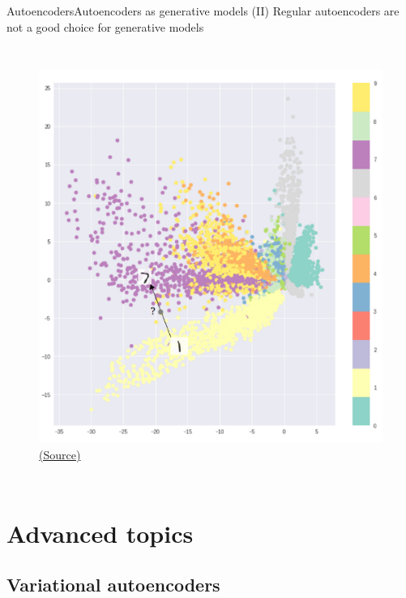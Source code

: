 \documentclass[10pt,compress]{beamer} %
\begin{document}
\begin{frame}{Autoencoders}{Autoencoders as generative models (II)}
	Regular autoencoders are not a good choice for generative models

    \begin{columns}
		\begin{figure}
	        \includegraphics[width=\textwidth]{figs/latent.png}\\
		\scriptsize\href{https://towardsdatascience.com/intuitively-understanding-variational-autoencoders-1bfe67eb5daf}{(Source)}
		\end{figure}
    \end{columns}

\end{frame}


\section{Advanced topics}

\subsection{Variational autoencoders}
\end{document}
